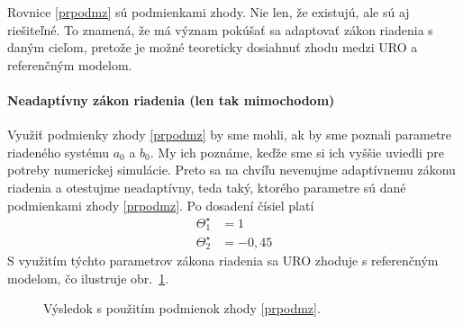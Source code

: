 \documentclass[a4paper, 10pt, ]{article}
\begin{document}
Rovnice \eqref{prpodmz} sú podmienkami zhody. Nie len, že existujú, ale sú aj riešiteľné. To znamená, že má význam pokúšať sa adaptovať zákon riadenia s daným cieľom, pretože je možné teoreticky dosiahnuť zhodu medzi URO a referenčným modelom.


\paragraph{Neadaptívny zákon riadenia (len tak mimochodom)}
Využiť podmienky zhody \eqref{prpodmz} by sme mohli, ak by sme poznali parametre riadeného systému $a_0$ a $b_0$. My ich poznáme, keďže sme si ich vyššie uviedli pre potreby numerickej simulácie. Preto sa na chvíľu nevenujme adaptívnemu zákonu riadenia a otestujme neadaptívny, teda taký, ktorého parametre sú dané podmienkami zhody \eqref{prpodmz}. Po dosadení čísiel platí
\begin{subequations}
    \begin{align}
        \Theta_1^\star &= 1  \\
        \Theta_2^\star &= -0,45
    \end{align}
\end{subequations}
S využitím týchto parametrov zákona riadenia sa URO zhoduje s referenčným modelom, čo ilustruje obr.~\ref{fig_tex_01_1}.






\begin{figure}[t]
	\centering


	\caption{Výsledok s použitím podmienok zhody \eqref{prpodmz}.}
	\label{fig_tex_01_1}

\end{figure}




\bigskip
\end{document}
